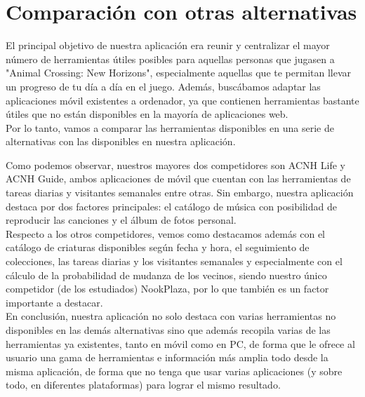 \chapter{Comparación con otras alternativas}\label{alternativas}

El principal objetivo de nuestra aplicación era reunir y centralizar el mayor número de herramientas útiles posibles para aquellas personas que jugasen a "Animal Crossing: New Horizons", especialmente aquellas que te permitan llevar un progreso de tu día a día en el juego. Además, buscábamos adaptar las aplicaciones móvil existentes a ordenador, ya que contienen herramientas bastante útiles que no están disponibles en la mayoría de aplicaciones web.\\

Por lo tanto, vamos a comparar las herramientas disponibles en una serie de alternativas con las disponibles en nuestra aplicación.\\


Como podemos observar, nuestros mayores dos competidores son ACNH Life y ACNH Guide, ambos aplicaciones de móvil que cuentan con las herramientas de tareas diarias y visitantes semanales entre otras. Sin embargo, nuestra aplicación destaca por dos factores principales: el catálogo de música con posibilidad de reproducir las canciones y el álbum de fotos personal.\\

Respecto a los otros competidores, vemos como destacamos además con el catálogo de criaturas disponibles según fecha y hora, el seguimiento de colecciones, las tareas diarias y los visitantes semanales y especialmente con el cálculo de la probabilidad de mudanza de los vecinos, siendo nuestro único competidor (de los estudiados) NookPlaza, por lo que también es un factor importante a destacar.\\

En conclusión, nuestra aplicación no solo destaca con varias herramientas no disponibles en las demás alternativas sino que además recopila varias de las herramientas ya existentes, tanto en móvil como en PC, de forma que le ofrece al usuario una gama de herramientas e información más amplia todo desde la misma aplicación, de forma que no tenga que usar varias aplicaciones (y sobre todo, en diferentes plataformas) para lograr el mismo resultado.













	








	
	 




